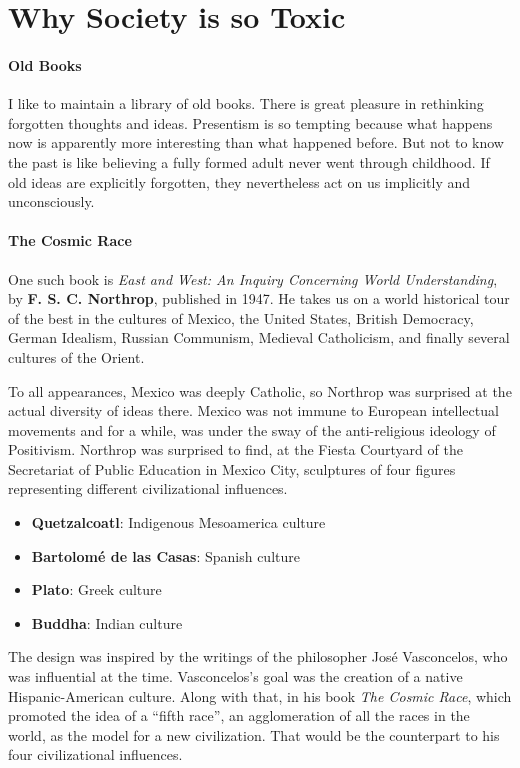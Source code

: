 \section{Why Society is so Toxic}

\paragraph{Old Books}

I like to maintain a library of old books. There is great pleasure in rethinking forgotten thoughts and ideas. Presentism is so tempting because what happens now is apparently more interesting than what happened before. But not to know the past is like believing a fully formed adult never went through childhood. If old ideas are explicitly forgotten, they nevertheless act on us implicitly and unconsciously.

\paragraph{The Cosmic Race}


One such book is \emph{East and West: An Inquiry Concerning World Understanding}, by \textbf{F. S. C. Northrop}, published in 1947. He takes us on a world historical tour of the best in the cultures of Mexico, the United States, British Democracy, German Idealism, Russian Communism, Medieval Catholicism, and finally several cultures of the Orient.

To all appearances, Mexico was deeply Catholic, so Northrop was surprised at the actual diversity of ideas there. Mexico was not immune to European intellectual movements and for a while, was under the sway of the anti-religious ideology of Positivism. Northrop was surprised to find, at the Fiesta Courtyard of the Secretariat of Public Education in Mexico City, sculptures of four figures representing different civilizational influences.

\begin{itemize}
\item \textbf{Quetzalcoatl}: Indigenous Mesoamerica culture
\item \textbf{Bartolomé de las Casas}: Spanish culture
\item \textbf{Plato}: Greek culture
\item \textbf{Buddha}: Indian culture
\end{itemize}


The design was inspired by the writings of the philosopher José Vasconcelos, who was influential at the time. Vasconcelos's goal was the creation of a native Hispanic-American culture. Along with that, in his book \emph{The Cosmic Race}, which promoted the idea of a ``fifth race'', an agglomeration of all the races in the world, as the model for a new civilization. That would be the counterpart to his four civilizational influences.

